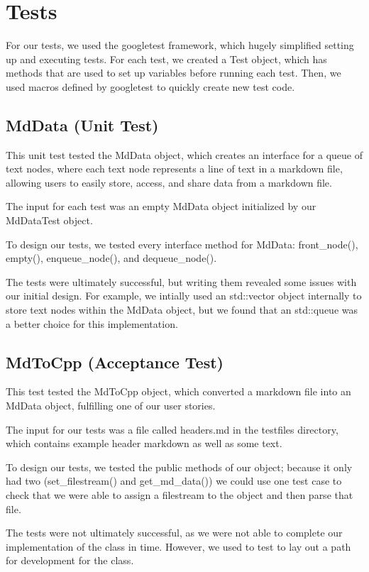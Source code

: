 \section{Tests}

For our tests, we used the googletest framework, which hugely simplified setting up and executing tests. For each test, we created a Test object, which has methods that are used to set up variables before running each test. Then, we used macros defined by googletest to quickly create new test code.

\subsection{MdData (Unit Test)}

This unit test tested the MdData object, which creates an interface for a queue of text nodes, where each text node represents a line of text in a markdown file, allowing users to easily store, access, and share data from a markdown file.

The input for each test was an empty MdData object initialized by our MdDataTest object.

To design our tests, we tested every interface method for MdData: front\_node(), empty(), enqueue\_node(), and dequeue\_node(). 

The tests were ultimately successful, but writing them revealed some issues with our initial design. For example, we intially used an std::vector object internally to store text nodes within the MdData object, but we found that an std::queue was a better choice for this implementation.

\subsection{MdToCpp (Acceptance Test)}

This test tested the MdToCpp object, which converted a markdown file into an MdData object, fulfilling one of our user stories.

The input for our tests was a file called headers.md in the testfiles directory, which contains example header markdown as well as some text.

To design our tests, we tested the public methods of our object; because it only had two (set\_filestream() and get\_md\_data()) we could use one test case to check that we were able to assign a filestream to the object and then parse that file.

The tests were not ultimately successful, as we were not able to complete our implementation of the class in time. However, we used to test to lay out a path for development for the class.
